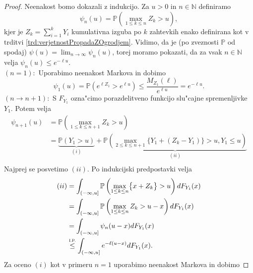 \documentclass[12pt, a4paper, reqno]{amsart}
\theoremstyle{definition}
\theoremstyle{plain}
\newcommand{\N}{\mathbb{N}}
\newcommand{\Prob}{\mathbb{P}}
\newcommand{\1}{\mathds{1}}
\begin{document}
            \begin{proof}
                Neenakost bomo dokazali z indukcijo. Za $u>0$ in $n\in\N$ definiramo
                \begin{equation*}
                    \psi_n(u) = \Prob\left(\max_{1\leq k\leq n}Z_k > u\right),
                \end{equation*}
                kjer je $Z_k = \sum_{i=1}^kY_i$ kumulativna izguba po $k$ zahtevkih enako definirana 
                kot v trditvi \ref{trd:verjetnostPropadaZOgrodjem}.
                Vidimo, da je (po zveznosti $\mathbb{P}$ od spodaj) $\psi(u) = \lim_{n\to\infty}\psi_n(u)$, 
                torej moramo pokazati, da za vsak $n\in\N$ velja $\psi_n(u) \leq e^{-\ell u}$. \\
                $(n = 1):$ Uporabimo neenakost Markova in dobimo
                \begin{equation*}
                    \psi_1(u) = \Prob\left(e^{\ell Z_1} > e^{\ell u}\right) \leq \frac{M_{Z_1}(\ell)}{e^{\ell u}} = e^{-\ell u}.
                \end{equation*}
                $(n \rightarrow n+1):$ 
                S $F_{Y_1}$ ozna"cimo porazdelitveno funkcijo slu"cajne spremenljivke
                 $Y_1$. Potem velja
                \begin{align*}
                    \psi_{n+1}(u) &= \Prob\left(\max_{1\leq k\leq n+1}Z_k > u\right) \\
                                  &= \underbrace{\Prob\left(Y_1 > u\right)}_{(i)} + 
                                  \underbrace{\Prob\left(\max_{2\leq k\leq n+1}\bigl\{Y_1 + (Z_k - Y_1)\bigr\} > u, Y_1 \leq u\right)}_{(ii)} \\
                \end{align*}
                Najprej se posvetimo $(ii)$. Po indukcijski predpostavki velja 
                \begin{align*}
                    (ii) &= \int_{(-\infty, u]}\Prob\left(\max_{1\leq k\leq n}\bigl\{x + Z_k\bigr\} > u\right)dF_{Y_1}(x) \\
                         &= \int_{(-\infty, u]}\Prob\left(\max_{1\leq k\leq n}Z_k > u - x\right)dF_{Y_1}(x) \\
                         &= \int_{(-\infty, u]}\psi_n(u - x)dF_{Y_1}(x) \\
                         &\stackrel{\text{\scalebox{0.8}{I.P.}}}{\leq} \int_{(-\infty, u]}e^{-\ell(u - x)}dF_{Y_1}(x). \\
                \end{align*}
                Za oceno $(i)$ kot v primeru $n=1$ uporabimo neenakost Markova in dobimo


\end{proof}
\end{document}
